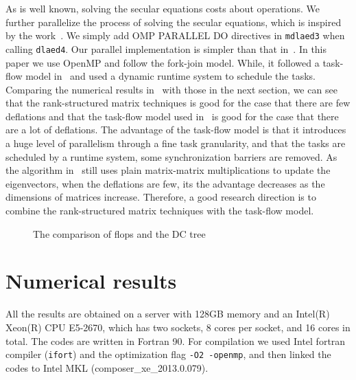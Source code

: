 \documentclass[times]{nlaauth}
\newcounter{algorithm}
\begin{document}
As is well known, solving the secular equations costs about  operations.
We further parallelize the process of solving the secular equations, which is
inspired by the work~\cite{DC_quark}.
We simply add OMP PARALLEL DO directives in \texttt{mdlaed3} when calling \texttt{dlaed4}.
Our parallel implementation is simpler than that in~\cite{DC_quark}.
In this paper we use OpenMP and follow the fork-join model.
While, it followed a task-flow model in~\cite{DC_quark} and used a dynamic runtime system to schedule the tasks.
Comparing the numerical results in~\cite{DC_quark} with those in the next section, we can see that the
rank-structured matrix techniques is good for the case that there are few deflations and that
the task-flow model used in~\cite{DC_quark} is good for the case that there are a lot of
deflations.
The advantage of the task-flow model is that it introduces a huge level of parallelism
through a fine task granularity, and that the tasks are scheduled by a runtime system, some synchronization barriers are removed.
As the algorithm in~\cite{DC_quark} still uses plain matrix-matrix multiplications to update the eigenvectors,
when the deflations are few, its the advantage decreases as
the dimensions of matrices increase.
Therefore, a good research direction is to combine the rank-structured matrix techniques with the task-flow model.


\begin{figure}[ptbh]
\centering
{}
\caption{The comparison of flops and the DC tree}\label{fig:flops_res}
\end{figure}


\section{Numerical results}
\label{sec:numer-tedc}

All the results are obtained on a server with 128GB memory and an Intel(R) Xeon(R) CPU E5-2670, which has
two sockets, 8 cores per socket, and 16 cores in total.
The codes are written in Fortran 90.
For compilation we used Intel fortran compiler (\texttt{ifort}) and the optimization flag
\texttt{-O2 -openmp}, and then linked the codes to Intel MKL (composer\_xe\_2013.0.079).
\end{document}
